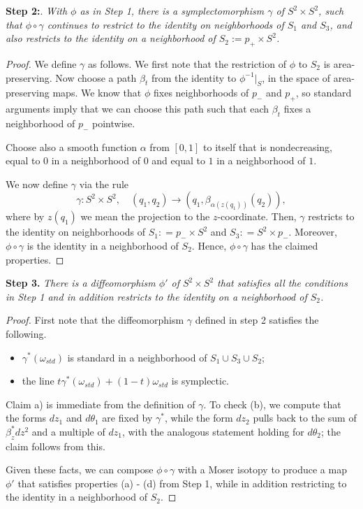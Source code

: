 \documentclass[11pt, reqno]{amsart}
\theoremstyle{remark}
\numberwithin{equation}{subsection}
\numberwithin{figure}{section}
\theoremstyle{customremark}
\newcommand{\NI}{{\noindent}}
\newcommand{\om}{{\omega}}
\begin{document}
 \NI {\bf Step 2:}. 
 {\it  With 
 $\phi$ as in Step 1, there is
 a symplectomorphism $\gamma$ of $S^2 \times S^2$, such that $\phi \circ \gamma$ continues to restrict to the identity on
neighborhoods of $S_1$ and $S_3$,
and also 
restricts to the identity on a neighborhood of $S_2:= p_+ \times S^2$.} 
\begin{proof}
We  define $\gamma$ as follows.  We first note that the restriction of $\phi$ to $S_2$ is area-preserving.  Now   
choose a path $\beta_t$ from the identity to 
$\phi^{-1}|_S$, in the space of area-preserving maps.  We know that $\phi$ fixes neighborhoods of $p_-$ and $p_+$, so standard arguments
imply that we can choose this path such that each $\beta_t$ fixes 
a neighborhood of $p_-$ pointwise.  

Choose also a smooth function $\alpha$ from $[0,1]$ to itself that is nondecreasing, equal to $0$ in a neighborhood of $0$ and equal to $1$ in a neighborhood of $1$.

We now define $\gamma$ via the rule
\[ \gamma: S^2 \times S^2, \quad (q_1,q_2) \to (q_1, \beta_{\alpha(z(q_1))}(q_2)),\]
 where by $z(q_1)$ we mean the projection to the $z$-coordinate.
Then, $\gamma$ restricts to the identity on neighborhoods of $S_1: = p_- \times S^2$ and $S_3: = S^2 \times p_-$.
Moreover, $\phi \circ \gamma$ is the identity
in a neighborhood of
$S_2$.   Hence, $\phi \circ \gamma$ has the claimed properties.    
\end{proof}


\NI {\bf Step 3.}  {\it There is a diffeomorphism
 $\phi'$
of $S^2 \times S^2$ that satisfies all the conditions in Step 1 and in addition restricts to the identity on a neighborhood of $S_2$.}

\begin{proof}
First note that the diffeomorphism $\gamma$ defined in step 2 satisfies the following.

\begin{itemize}\item[{\rm (a)}]
 $\gamma^*(\om_{std})$ is standard in a neighborhood of $S_1 \cup S_3 \cup S_2$; 
 
\item[{\rm (b)}] the line $t  \gamma^*(\om_{std}) + (1-t) \omega_{std}$ is symplectic.  
\end{itemize}


Claim a) is immediate from the definition of $\gamma$.  To check (b), we compute that the forms $dz_1$ and $d\theta_1$ are fixed by $\gamma^*$,  while the form $dz_2$ pulls back to the sum of $\beta_z^*dz^2$ and a multiple of $dz_1$, with the analogous statement holding for $d \theta_2$; the claim follows from this.
  
Given these facts, we can compose $\phi \circ \gamma$ with a Moser isotopy to produce a map $\phi'$ that satisfies properties (a) - (d) from Step 1, while in addition 
restricting to the identity in a neighborhood
of $S_2$. \end{proof}
\end{document}
